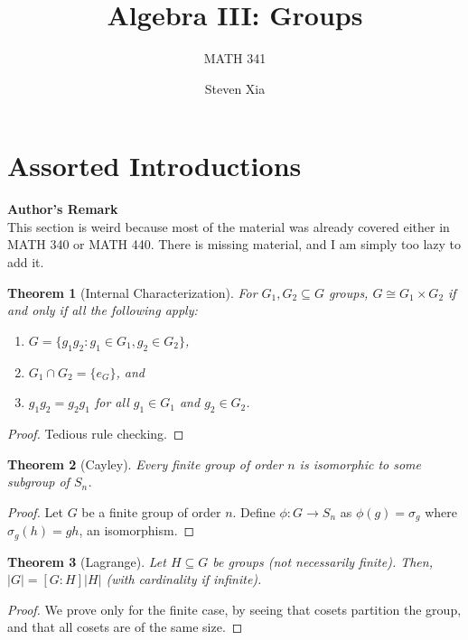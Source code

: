 \documentclass[
    parskip=half,
    toc=flat,
    toc=sectionentrydotfill,
]{scrartcl}  %
\title{Algebra III: Groups}
\subtitle{MATH 341}
\author{Steven Xia}
\theoremstyle{definition}
\theoremstyle{plain}
\newtheorem{theorem}{Theorem}[section]
\theoremstyle{remark}
\begin{document}
\maketitle
\tableofcontents


\section{Assorted Introductions}


\begin{center}
    \textbf{Author's Remark}\\
    This section is weird because most of the material was already covered either in MATH 340 or
    MATH 440.
    There is missing material, and I am simply too lazy to add it.
\end{center}

\begin{theorem}[Internal Characterization]
    For $G_1,G_2\subseteq G$ groups, $G\cong G_1\times G_2$ if and only if all the following apply:
    \begin{enumerate}[nosep]
        \item $G=\{g_1g_2:g_1\in G_1,g_2\in G_2\}$,
        \item $G_1\cap G_2=\{e_G\}$, and
        \item $g_1g_2=g_2g_1$ for all $g_1\in G_1$ and $g_2\in G_2$.
    \end{enumerate}
\end{theorem}

\begin{proof}
    Tedious rule checking.
\end{proof}

\begin{theorem}[Cayley]
    Every finite group of order $n$ is isomorphic to some subgroup of $S_n$.
\end{theorem}

\begin{proof}
    Let $G$ be a finite group of order $n$.
    Define $\phi:G\to S_n$ as $\phi(g)=\sigma_g$ where $\sigma_g(h)=gh$, an isomorphism.
\end{proof}

\begin{theorem}[Lagrange]
    Let $H\subseteq G$ be groups (not necessarily finite).
    Then, $|G|=[G:H]|H|$ (with cardinality if infinite).
\end{theorem}

\begin{proof}
    We prove only for the finite case, by seeing that cosets partition the group, and that all
    cosets are of the same size.
\end{proof}
\end{document}
